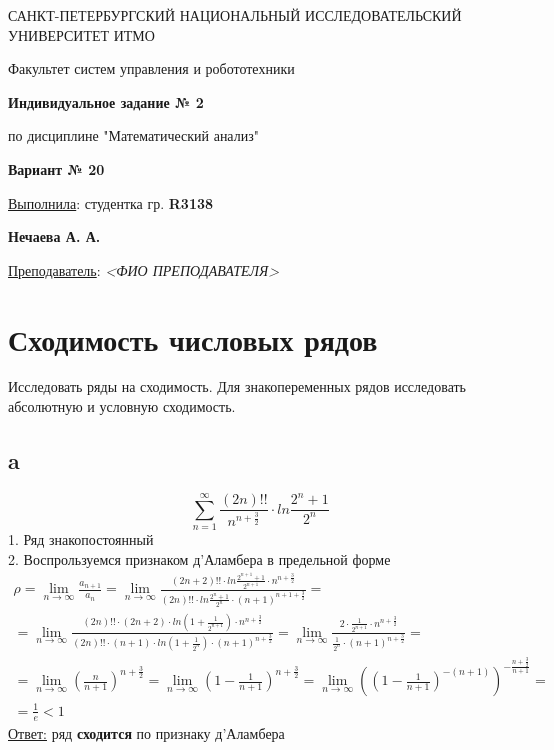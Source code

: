 \documentclass[a5paper, 10pt]{article}
\theoremstyle{definition}
\theoremstyle{plain}
\theoremstyle{remark}
\newcommand*{\titlePage}{
	\thispagestyle{title}
	\begingroup
	\begin{center}
		\vspace*{6ex}
		
		{\small
			САНКТ-ПЕТЕРБУРГСКИЙ НАЦИОНАЛЬНЫЙ ИССЛЕДОВАТЕЛЬСКИЙ УНИВЕРСИТЕТ ИТМО
		}
		
		\vspace*{2ex}
		
		{\normalsize
			Факультет систем управления и робототехники
		}
		
		\vspace*{15ex}
		
		{\Large \bfseries 
			Индивидуальное задание № 2
		}

\vspace*{2ex}
		
		{\normalsize
			по дисциплине "Математический анализ"
		}
\vspace*{5ex}
		
		{\Large \bfseries 
			 Вариант № 20
		}
	\end{center}
	\vspace*{20ex}
	\begin{flushright}
		{\large 
			\underline{Выполнила}: студентка гр. \textbf{R3138}\\
			\begin{flushright}
				\textbf{Нечаева А. А.}\\
			\end{flushright}
		}
		
		\vspace*{5ex}
		
		{\large 
			\underline{Преподаватель}: \textit{<ФИО ПРЕПОДАВАТЕЛЯ>}
		}
	\end{flushright}	
	\newpage
	\setcounter{page}{2}
	\endgroup}
\begin{document}
	\titlePage
	\pagestyle{style}
\newpage
\section{ Сходимость числовых рядов}
Исследовать ряды на сходимость. Для знакопеременных рядов исследовать абсолютную и условную сходимость.	

\subsection{a}
\begin{equation}
\sum \limits_{n = 1}^{\infty} \frac{\left(2n\right)!!}{n^{n+\frac{3}{2}}} \cdot ln \frac{2^n+1}{2^n}
\end{equation}
1. Ряд знакопостоянный\\
2. Воспрользуемся признаком д'Аламбера в предельной форме
\begin{multline*}
\rho = \lim_{n \to \infty} \frac{a_{n+1}}{a_n} = \lim_{n \to \infty} \frac{\left(2n+2\right)!! \cdot ln\frac{2^{n+1}+1}{2^{n+1}}\cdot n^{n+\frac{3}{2}}}{\left(2n\right)!! \cdot ln\frac{2^{n}+1}{2^{n}}\cdot (n+1)^{n + 1+\frac{3}{2}}} =\\
=  \lim_{n \to \infty} \frac{\left(2n\right)!!\cdot \left(2n+2\right) \cdot ln\left(1 + \frac{1}{2^{n+1}}\right)\cdot n^{n+\frac{3}{2}}}{\left(2n\right)!! \cdot (n+1)\cdot ln\left(1 + \frac{1}{2^{n}}\right)\cdot (n+1)^{n + \frac{3}{2}}} =
 \lim_{n \to \infty} \frac{ 2\cdot  \frac{1}{2^{n+1}}\cdot n^{n+\frac{3}{2}}}{ \frac{1}{2^{n}}\cdot (n+1)^{n + \frac{3}{2}}}=\\ =\lim_{n \to \infty} \left(\frac{n}{n+1} \right)^{n+\frac{3}{2}}= \lim_{n \to \infty} \left(1 - \frac{1}{n+1} \right)^{n+\frac{3}{2}}=\lim_{n \to \infty}  \left( \left(1 - \frac{1}{n+1} \right)^{-(n+1) } \right)^{-\frac{n+\frac{3}{2}}{n+1} }=\\
= \frac{1}{e} < 1
\end{multline*}
\underline{Ответ:} ряд  \textbf{сходится}  по признаку  д'Аламбера
\end{document}
